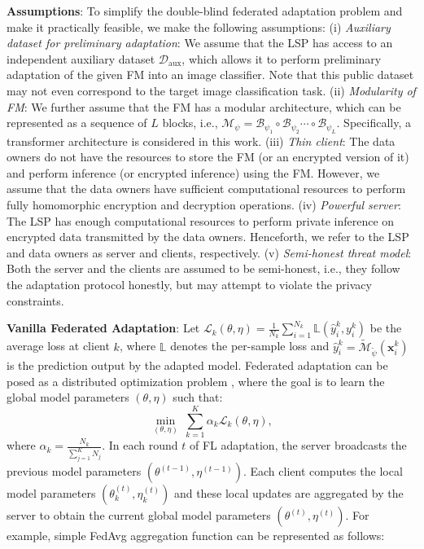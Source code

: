 \noindent \textbf{Assumptions}: To simplify the double-blind federated adaptation problem and make it practically feasible, we make the following assumptions: (i) \textit{Auxiliary dataset for preliminary adaptation}: We assume that the LSP has access to an independent auxiliary dataset $\mathcal{D}_{\text{aux}}$, which allows it to perform preliminary adaptation of the given FM into an image classifier. Note that this public dataset may not even correspond to the target image classification task. (ii) \textit{Modularity of FM}: We further assume that the FM has a modular architecture, which can be represented as a sequence of $L$ blocks, i.e., $\mathcal{M}_{\psi} = \mathcal{B}_{\psi_1} \circ \mathcal{B}_{\psi_2} \cdots \circ \mathcal{B}_{\psi_L}$. Specifically, a transformer architecture is considered in this work. (iii) \textit{Thin client}: The data owners do not have the resources to store the FM (or an encrypted version of it) and perform inference (or encrypted inference) using the FM. However, we assume that the data owners have sufficient computational resources to perform fully homomorphic encryption and decryption operations. (iv) \textit{Powerful server}: The LSP has enough computational resources to perform private inference on encrypted data transmitted by the data owners. Henceforth, we refer to the LSP and data owners as server and clients, respectively. (v) \textit{Semi-honest threat model}: Both the server and the clients are assumed to be semi-honest, i.e., they follow the adaptation protocol honestly, but may attempt to violate the privacy constraints. 

\noindent \textbf{Vanilla Federated Adaptation}: Let $\mathcal{L}_k(\theta,\eta) = \frac{1}{N_k} \sum_{i=1}^{N_k} \mathbb{L}(\hat{y}_i^k,y_i^k)$ be the average loss at client $k$, where $\mathbb{L}$ denotes the per-sample loss and $\hat{y}_i^k = \widetilde{\mathcal{M}}_{\widetilde{\psi}}(\mathbf{x}_i^k)$ is the prediction output by the adapted model. Federated adaptation can be posed as a distributed optimization problem \cite{mcmahan2017communication}, where the goal is to learn the global model parameters $(\theta,\eta)$ such that:
\begin{equation}
    \min_{(\theta,\eta)} ~ \sum_{k=1}^K \alpha_k \mathcal{L}_k(\theta,\eta), \nonumber
\label{eq:fed}
\end{equation}
\noindent where $\alpha_k = \frac{N_k}{\sum_{j=1}^K N_j}$. In each round $t$ of FL adaptation, the server broadcasts the previous model parameters $\left(\theta^{(t-1)},\eta^{(t-1)}\right)$. Each client computes the local model parameters $\left(\theta_k^{(t)},\eta_k^{(t)}\right)$ and these local updates are aggregated by the server to obtain the current global model parameters $\left(\theta^{(t)},\eta^{(t)}\right)$. For example, simple FedAvg aggregation function can be represented as follows:

